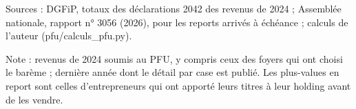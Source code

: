 Sources : DGFiP, totaux des déclarations 2042 des revenus de 2024 ; Assemblée nationale, rapport n° 3056 (2026), pour les reports arrivés à échéance ; calculs de l'auteur (pfu/calculs\_pfu.py).\par Note : revenus de 2024 soumis au PFU, y compris ceux des foyers qui ont choisi le barème ; dernière année dont le détail par case est publié. Les plus-values en report sont celles d'entrepreneurs qui ont apporté leurs titres à leur holding avant de les vendre.
